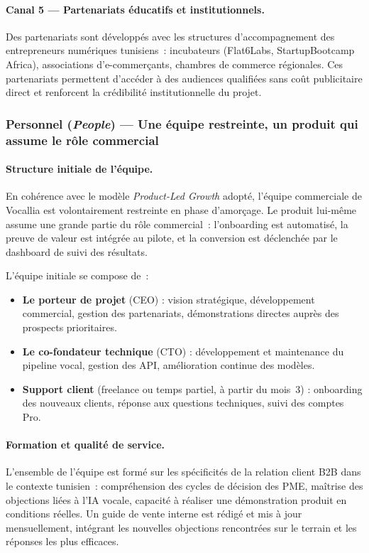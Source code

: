 \paragraph{Canal 5 --- Partenariats éducatifs et institutionnels.}
Des partenariats sont développés avec les structures d'accompagnement des
entrepreneurs numériques tunisiens~: incubateurs (Flat6Labs, StartupBootcamp
Africa), associations d'e-commerçants, chambres de commerce régionales. Ces
partenariats permettent d'accéder à des audiences qualifiées sans coût
publicitaire direct et renforcent la crédibilité institutionnelle du projet.

\subsubsection{Personnel (\textit{People}) --- Une équipe restreinte,
un produit qui assume le rôle commercial}

\paragraph{Structure initiale de l'équipe.}
En cohérence avec le modèle \textit{Product-Led Growth} adopté, l'équipe
commerciale de Vocallia est volontairement restreinte en phase d'amorçage.
Le produit lui-même assume une grande partie du rôle commercial~: l'onboarding
est automatisé, la preuve de valeur est intégrée au pilote, et la
conversion est déclenchée par le dashboard de suivi des résultats.

L'équipe initiale se compose de~:
\begin{itemize}
    \item \textbf{Le porteur de projet} (CEO) : vision stratégique, développement
    commercial, gestion des partenariats, démonstrations directes auprès des
    prospects prioritaires.
    \item \textbf{Le co-fondateur technique} (CTO) : développement et maintenance
    du pipeline vocal, gestion des API, amélioration continue des modèles.
    \item \textbf{Support client} (freelance ou temps partiel, à partir du
    mois~3) : onboarding des nouveaux clients, réponse aux questions techniques,
    suivi des comptes Pro.
\end{itemize}

\paragraph{Formation et qualité de service.}
L'ensemble de l'équipe est formé sur les spécificités de la relation client
B2B dans le contexte tunisien~: compréhension des cycles de décision des PME,
maîtrise des objections liées à l'IA vocale, capacité à réaliser une
démonstration produit en conditions réelles. Un guide de vente interne est
rédigé et mis à jour mensuellement, intégrant les nouvelles objections rencontrées
sur le terrain et les réponses les plus efficaces.

